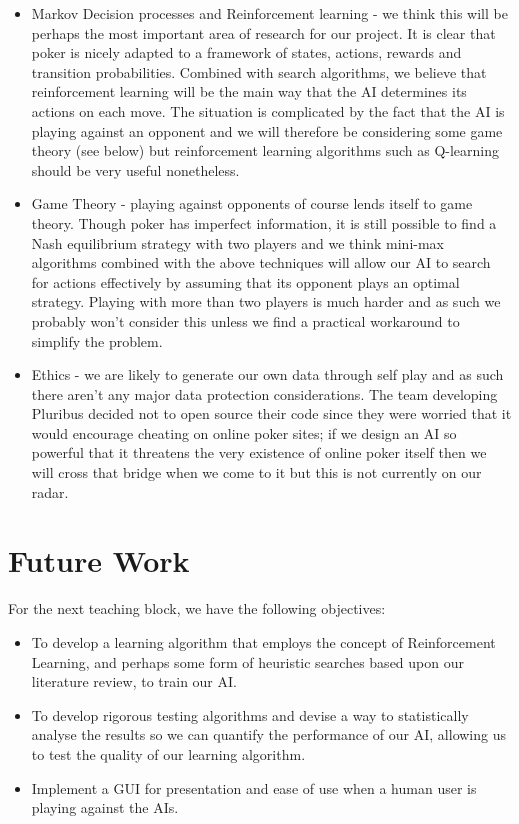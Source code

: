 \documentclass{article}
\begin{document}
\begin{multicols*}{2}
\begin{itemize}
    \item Markov Decision processes and Reinforcement learning - we think this will be perhaps the most important area of research for our project. It is clear that poker is nicely adapted to a framework of states, actions, rewards and transition probabilities. Combined with search algorithms, we believe that reinforcement learning will be the main way that the AI determines its actions on each move. The situation is complicated by the fact that the AI is playing against an opponent and we will therefore be considering some game theory (see below) but reinforcement learning algorithms such as Q-learning should be very useful nonetheless.
    \item Game Theory - playing against opponents of course lends itself to game theory. Though poker has imperfect information, it is still possible to find a Nash equilibrium strategy with two players and we think mini-max algorithms combined with the above techniques will allow our AI to search for actions effectively by assuming that its opponent plays an optimal strategy. Playing with more than two players is much harder and as such we probably won't consider this unless we find a practical workaround to simplify the problem.
    \item Ethics - we are likely to generate our own data through self play and as such there aren't any major data protection considerations. The team developing Pluribus decided not to open source their code since they were worried that it would encourage cheating on online poker sites; if we design an AI so powerful that it threatens the very existence of online poker itself then we will cross that bridge when we come to it but this is not currently on our radar.
\end{itemize}

\section{Future Work}
For the next teaching block, we have the following objectives:
\begin{itemize}
    \item To develop a learning algorithm that employs the concept of Reinforcement Learning, and perhaps some form of heuristic searches based upon our literature review, to train our AI.
    \item To develop rigorous testing algorithms and devise a way to statistically analyse the results so we can quantify the performance of our AI, allowing us to test the quality of our learning algorithm.
    \item Implement a GUI for presentation and ease of use when a human user is playing against the AIs.
\end{itemize}





\end{multicols*}
\end{document}
